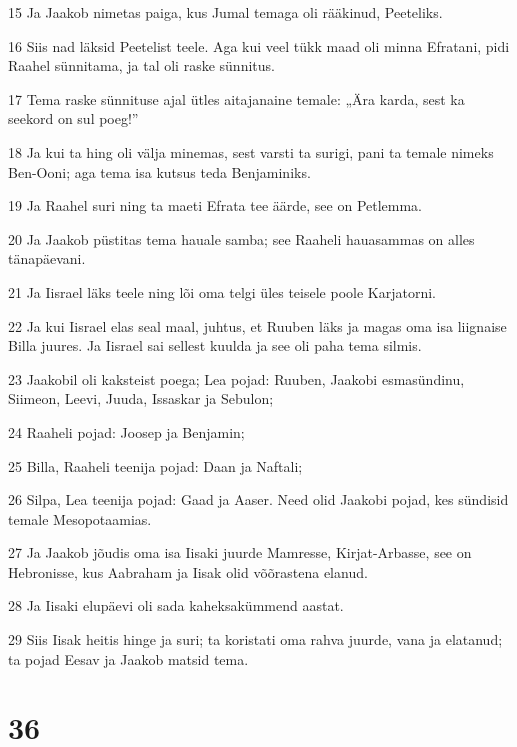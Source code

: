 \par 15 Ja Jaakob nimetas paiga, kus Jumal temaga oli rääkinud, Peeteliks.
\par 16 Siis nad läksid Peetelist teele. Aga kui veel tükk maad oli minna Efratani, pidi Raahel sünnitama, ja tal oli raske sünnitus.
\par 17 Tema raske sünnituse ajal ütles aitajanaine temale: „Ära karda, sest ka seekord on sul poeg!”
\par 18 Ja kui ta hing oli välja minemas, sest varsti ta surigi, pani ta temale nimeks Ben-Ooni; aga tema isa kutsus teda Benjaminiks.
\par 19 Ja Raahel suri ning ta maeti Efrata tee äärde, see on Petlemma.
\par 20 Ja Jaakob püstitas tema hauale samba; see Raaheli hauasammas on alles tänapäevani.
\par 21 Ja Iisrael läks teele ning lõi oma telgi üles teisele poole Karjatorni.
\par 22 Ja kui Iisrael elas seal maal, juhtus, et Ruuben läks ja magas oma isa liignaise Billa juures. Ja Iisrael sai sellest kuulda ja see oli paha tema silmis.
\par 23 Jaakobil oli kaksteist poega; Lea pojad: Ruuben, Jaakobi esmasündinu, Siimeon, Leevi, Juuda, Issaskar ja Sebulon;
\par 24 Raaheli pojad: Joosep ja Benjamin;
\par 25 Billa, Raaheli teenija pojad: Daan ja Naftali;
\par 26 Silpa, Lea teenija pojad: Gaad ja Aaser. Need olid Jaakobi pojad, kes sündisid temale Mesopotaamias.
\par 27 Ja Jaakob jõudis oma isa Iisaki juurde Mamresse, Kirjat-Arbasse, see on Hebronisse, kus Aabraham ja Iisak olid võõrastena elanud.
\par 28 Ja Iisaki elupäevi oli sada kaheksakümmend aastat.
\par 29 Siis Iisak heitis hinge ja suri; ta koristati oma rahva juurde, vana ja elatanud; ta pojad Eesav ja Jaakob matsid tema.

\chapter{36}


